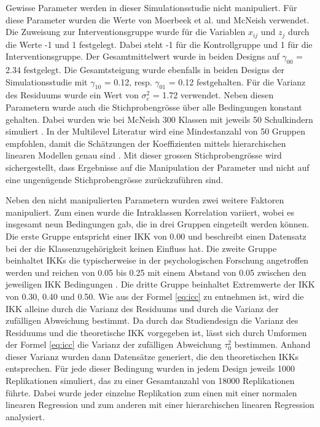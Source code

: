 \documentclass[12pt]{article}\usepackage[]{graphicx}\usepackage[]{color}
\begin{document}
Gewisse Parameter werden in dieser Simulationsstudie nicht manipuliert. Für diese Parameter wurden die Werte von Moerbeek et al. \citeyearpar{MOERBEEK2003341} und McNeish \citeyearpar{mcneish2014analyzing} verwendet. Die Zuweisung zur Interventionsgruppe wurde für die Variablen $x_{ij}$ und $z_{j}$ durch die Werte -1 und 1 festgelegt. Dabei steht -1 für die Kontrollgruppe und 1 für die Interventionsgruppe. Der Gesamtmittelwert wurde in beiden Designs auf $\gamma_{00}$ = 2.34 festgelegt. Die Gesamtsteigung wurde ebenfalls in beiden Designs der Simulationsstudie mit $\gamma_{10}$ = 0.12, resp. $\gamma_{01}$ = 0.12 festgehalten. Für die Varianz des Residuums wurde ein Wert von $\sigma^{2}_{e}$ = 1.72 verwendet. Neben diesen Parametern wurde auch die Stichprobengrösse über alle Bedingungen konstant gehalten. Dabei wurden wie bei McNeish 300 Klassen mit jeweils 50 Schulkindern simuliert \citeyearpar{mcneish2014analyzing}. In der Multilevel Literatur wird eine Mindestanzahl von 50 Gruppen empfohlen, damit die Schätzungen der Koeffizienten mittels hierarchischen linearen Modellen genau sind \citep{maashox2005samplesize}. Mit dieser grossen Stichprobengrösse wird sichergestellt, dass Ergebnisse auf die Manipulation der Parameter und nicht auf eine ungenügende Stichprobengrösse zurückzuführen sind.

Neben den nicht manipulierten Parametern wurden zwei weitere Faktoren manipuliert. Zum einen wurde die Intraklassen Korrelation variiert, wobei es insgesamt neun Bedingungen gab, die in drei Gruppen eingeteilt werden können. Die erste Gruppe entspricht einer IKK von 0.00 und beschreibt einen Datensatz bei der die Klassenzugehörigkeit keinen Einfluss hat. Die zweite Gruppe beinhaltet IKKs die typischerweise in der psychologischen Forschung angetroffen werden und reichen von 0.05 bis 0.25 mit einem Abstand von 0.05 zwischen den jeweiligen IKK Bedingungen \citep{SnijdersTomA.B2012Ma:a}. Die dritte Gruppe beinhaltet Extremwerte der IKK von 0.30, 0.40 und 0.50. Wie aus der Formel \eqref{eq:icc} zu entnehmen ist, wird die IKK alleine durch die Varianz des Residuums und durch die Varianz der zufälligen Abweichung bestimmt. Da durch das Studiendesign die Varianz des Residuums und die theoretische IKK vorgegeben ist, lässt sich durch Umformen der Formel \eqref{eq:icc} die Varianz der zufälligen Abweichung $\tau^{2}_{0}$ bestimmen. Anhand dieser Varianz wurden dann Datensätze generiert, die den theoretischen IKKs entsprechen. Für jede dieser Bedingung wurden in jedem Design jeweils 1000 Replikationen simuliert, das zu einer Gesamtanzahl von 18000 Replikationen führte. Dabei wurde jeder einzelne Replikation zum einen mit einer normalen linearen Regression und zum anderen mit einer hierarchischen linearen Regression analysiert. 
\end{document}
